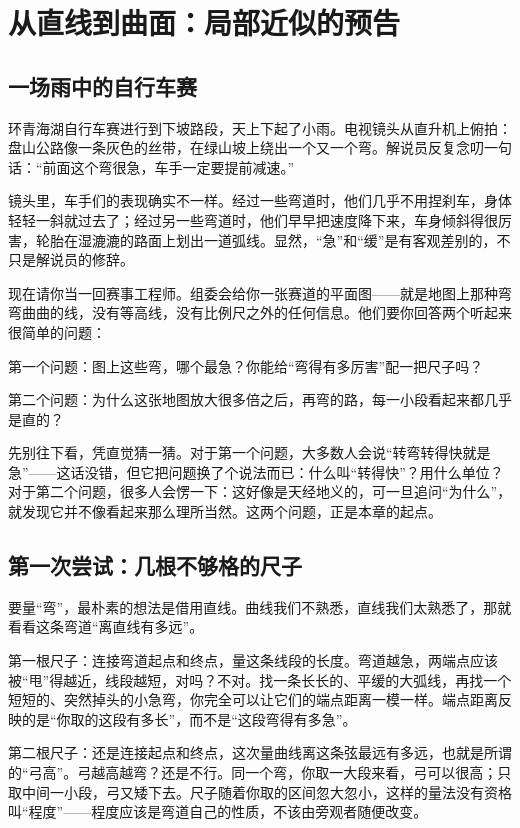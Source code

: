 \chapter{从直线到曲面：局部近似的预告}

\section{一场雨中的自行车赛}

环青海湖自行车赛进行到下坡路段，天上下起了小雨。电视镜头从直升机上俯拍：盘山公路像一条灰色的丝带，在绿山坡上绕出一个又一个弯。解说员反复念叨一句话：``前面这个弯很急，车手一定要提前减速。''

镜头里，车手们的表现确实不一样。经过一些弯道时，他们几乎不用捏刹车，身体轻轻一斜就过去了；经过另一些弯道时，他们早早把速度降下来，车身倾斜得很厉害，轮胎在湿漉漉的路面上划出一道弧线。显然，``急''和``缓''是有客观差别的，不只是解说员的修辞。

现在请你当一回赛事工程师。组委会给你一张赛道的平面图——就是地图上那种弯弯曲曲的线，没有等高线，没有比例尺之外的任何信息。他们要你回答两个听起来很简单的问题：

第一个问题：图上这些弯，哪个最急？你能给``弯得有多厉害''配一把尺子吗？

第二个问题：为什么这张地图放大很多倍之后，再弯的路，每一小段看起来都几乎是直的？

先别往下看，凭直觉猜一猜。对于第一个问题，大多数人会说``转弯转得快就是急''——这话没错，但它把问题换了个说法而已：什么叫``转得快''？用什么单位？对于第二个问题，很多人会愣一下：这好像是天经地义的，可一旦追问``为什么''，就发现它并不像看起来那么理所当然。这两个问题，正是本章的起点。

\section{第一次尝试：几根不够格的尺子}

要量``弯''，最朴素的想法是借用直线。曲线我们不熟悉，直线我们太熟悉了，那就看看这条弯道``离直线有多远''。

第一根尺子：连接弯道起点和终点，量这条线段的长度。弯道越急，两端点应该被``甩''得越近，线段越短，对吗？不对。找一条长长的、平缓的大弧线，再找一个短短的、突然掉头的小急弯，你完全可以让它们的端点距离一模一样。端点距离反映的是``你取的这段有多长''，而不是``这段弯得有多急''。

第二根尺子：还是连接起点和终点，这次量曲线离这条弦最远有多远，也就是所谓的``弓高''。弓越高越弯？还是不行。同一个弯，你取一大段来看，弓可以很高；只取中间一小段，弓又矮下去。尺子随着你取的区间忽大忽小，这样的量法没有资格叫``程度''——程度应该是弯道自己的性质，不该由旁观者随便改变。

